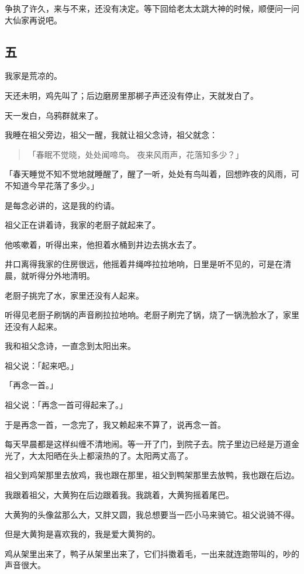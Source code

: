 \documentclass[UTF8]{ctexart}
\begin{document}
争执了许久，来与不来，还没有决定。等下回给老太太跳大神的时候，顺便问一问大仙家再说吧。

\subsection{五}

我家是荒凉的。

天还未明，鸡先叫了；后边磨房里那梆子声还没有停止，天就发白了。

天一发白，乌鸦群就来了。

我睡在祖父旁边，祖父一醒，我就让祖父念诗，祖父就念：

\begin{verse}
    「春眠不觉晓，处处闻啼鸟。
    夜来风雨声，花落知多少？」
\end{verse}

「春天睡觉不知不觉地就睡醒了，醒了一听，处处有鸟叫着，回想昨夜的风雨，可不知道今早花落了多少。」

是每念必讲的，这是我的约请。

祖父正在讲着诗，我家的老厨子就起来了。

他咳嗽着，听得出来，他担着水桶到井边去挑水去了。

井口离得我家的住房很远，他摇着井绳哗拉拉地响，日里是听不见的，可是在清晨，就听得分外地清明。

老厨子挑完了水，家里还没有人起来。

听得见老厨子刷锅的声音刷拉拉地响。老厨子刷完了锅，烧了一锅洗脸水了，家里还没有人起来。

我和祖父念诗，一直念到太阳出来。

祖父说：「起来吧。」

「再念一首。」

祖父说：「再念一首可得起来了。」

于是再念一首，一念完了，我又赖起来不算了，说再念一首。

每天早晨都是这样纠缠不清地闹。等一开了门，到院子去。院子里边已经是万道金光了，大太阳晒在头上都滚热的了。太阳两丈高了。

祖父到鸡架那里去放鸡，我也跟在那里，祖父到鸭架那里去放鸭，我也跟在后边。

我跟着祖父，大黄狗在后边跟着我。我跳着，大黄狗摇着尾巴。

大黄狗的头像盆那么大，又胖又圆，我总想要当一匹小马来骑它。祖父说骑不得。

但是大黄狗是喜欢我的，我是爱大黄狗的。

鸡从架里出来了，鸭子从架里出来了，它们抖擞着毛，一出来就连跑带叫的，吵的声音很大。
\end{document}
